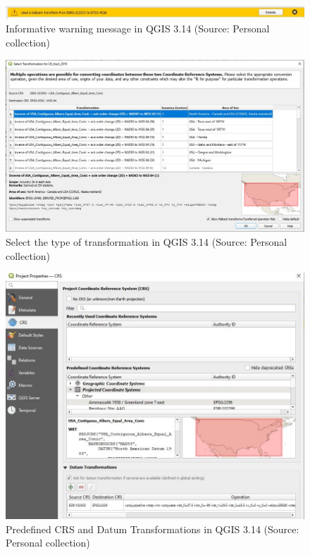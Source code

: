 \documentclass[a4paper,10pt,twoside]{article}
\begin{document}
\begin{figure}[hbt!] 
\begin{center}
\includegraphics[width=17cm]{../pictures/qgis_warning_window.JPG} 
\caption[Informative warning message  in QGIS 3.14]{Informative warning message  in QGIS 3.14 (Source: Personal collection)}
\label{fig:qgis_warning_window}
\end{center}
\end{figure}

\begin{figure}[hbt!] 
\begin{center}
\includegraphics[width=14cm]{../pictures/qgis_transformation.JPG} 
\caption[Select the type of transformation in QGIS 3.14]{Select the type of transformation in QGIS 3.14 (Source: Personal collection)}
\label{fig:qgis_transformation}
\end{center}
\end{figure}

\begin{figure}[hbt!] 
\begin{center}
\includegraphics[width=14cm]{../pictures/qgis_trans.JPG} 
\caption[Predefined CRS and Datum Transformations in QGIS 3.14]{Predefined CRS and Datum Transformations in QGIS 3.14 (Source: Personal collection)}
\label{fig:qgis_trans}
\end{center}
\end{figure}
\end{document}
